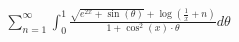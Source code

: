 \documentclass[preview]{standalone}
\begin{document}
\begin{align*}
\sum_{n=1}^{\infty} \int_{0}^{1}  \frac{\sqrt{e^{2x} + \sin(\theta)} + \log\left(\frac{1}{x} + n\right)}{1 + \cos^2(x) \cdot \theta} d\theta
\end{align*}
\end{document}
